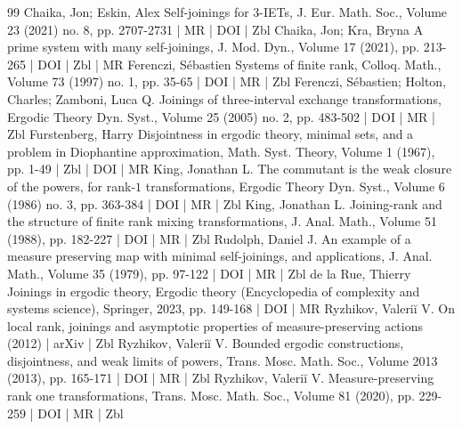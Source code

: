 \begin{thebibliography}{99}
 Chaika, Jon; Eskin, Alex Self-joinings for 3-IETs, J. Eur. Math. Soc., Volume 23 (2021) no. 8, pp. 2707-2731 | MR | DOI | Zbl
 Chaika, Jon; Kra, Bryna A prime system with many self-joinings, J. Mod. Dyn., Volume 17 (2021), pp. 213-265 | DOI | Zbl | MR
 Ferenczi, Sébastien Systems of finite rank, Colloq. Math., Volume 73 (1997) no. 1, pp. 35-65 | DOI | MR | Zbl
 Ferenczi, Sébastien; Holton, Charles; Zamboni, Luca Q. Joinings of three-interval exchange transformations, Ergodic Theory Dyn. Syst., Volume 25 (2005) no. 2, pp. 483-502 | DOI | MR | Zbl
 Furstenberg, Harry Disjointness in ergodic theory, minimal sets, and a problem in Diophantine approximation, Math. Syst. Theory, Volume 1 (1967), pp. 1-49 | Zbl | DOI | MR
 King, Jonathan L. The commutant is the weak closure of the powers, for rank-$1$ transformations, Ergodic Theory Dyn. Syst., Volume 6 (1986) no. 3, pp. 363-384 | DOI | MR | Zbl
 King, Jonathan L. Joining-rank and the structure of finite rank mixing transformations, J. Anal. Math., Volume 51 (1988), pp. 182-227 | DOI | MR | Zbl
 Rudolph, Daniel J. An example of a measure preserving map with minimal self-joinings, and applications, J. Anal. Math., Volume 35 (1979), pp. 97-122 | DOI | MR | Zbl
 de la Rue, Thierry Joinings in ergodic theory, Ergodic theory (Encyclopedia of complexity and systems science), Springer, 2023, pp. 149-168 | DOI | MR
 Ryzhikov, Valeriĭ V. On local rank, joinings and asymptotic properties of measure-preserving actions (2012) | arXiv | Zbl
 Ryzhikov, Valeriĭ V. Bounded ergodic constructions, disjointness, and weak limits of powers, Trans. Mosc. Math. Soc., Volume 2013 (2013), pp. 165-171 | DOI | MR | Zbl
 Ryzhikov, Valeriĭ V. Measure-preserving rank one transformations, Trans. Mosc. Math. Soc., Volume 81 (2020), pp. 229-259 | DOI | MR | Zbl
\end{thebibliography}
